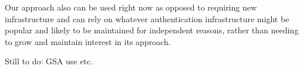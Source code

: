 \documentclass[10pt, conference, compsocconf]{styles/IEEEtran}
\newcommand{\point}[1]{\noindent\textbf{#1}.}
\begin{document}
Our approach also can be used right now as opposed to
requiring new infrastructure and can rely on whatever authentication
infrastructure might be popular and likely to be maintained for
independent reasons, rather than needing to grow and maintain
interest in its approach.


Still to do: GSA use etc.




 
\newcommand{\BIBdecl}{\setlength{\itemsep}{0\baselineskip plus 0.1\baselineskip minus 0.1\baselineskip}}
\balance
{\footnotesize 


}

 
%
\end{document}
